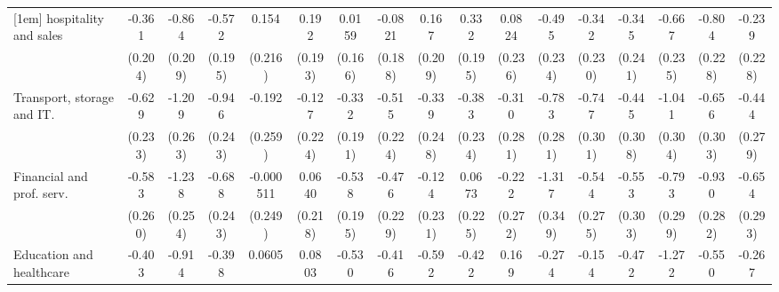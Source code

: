 {\begin{tabular}{l*{16}{c}}
[1em]
hospitality and sales&      -0.361         &      -0.864\sym{***}&      -0.572\sym{**} &       0.154         &       0.192         &      0.0159         &     -0.0821         &       0.167         &       0.332         &      0.0824         &      -0.495\sym{*}  &      -0.342         &      -0.345         &      -0.667\sym{**} &      -0.804\sym{***}&      -0.239         \\
                    &     (0.204)         &     (0.209)         &     (0.195)         &     (0.216)         &     (0.193)         &     (0.166)         &     (0.188)         &     (0.209)         &     (0.195)         &     (0.236)         &     (0.234)         &     (0.230)         &     (0.241)         &     (0.235)         &     (0.228)         &     (0.228)         \\
[1em]
Transport, storage and IT.&      -0.629\sym{**} &      -1.209\sym{***}&      -0.946\sym{***}&      -0.192         &      -0.127         &      -0.332         &      -0.515\sym{*}  &      -0.339         &      -0.383         &      -0.310         &      -0.783\sym{**} &      -0.747\sym{*}  &      -0.445         &      -1.041\sym{***}&      -0.656\sym{*}  &      -0.444         \\
                    &     (0.233)         &     (0.263)         &     (0.243)         &     (0.259)         &     (0.224)         &     (0.191)         &     (0.224)         &     (0.248)         &     (0.234)         &     (0.281)         &     (0.281)         &     (0.301)         &     (0.308)         &     (0.304)         &     (0.303)         &     (0.279)         \\
[1em]
Financial and prof. serv.&      -0.583\sym{*}  &      -1.238\sym{***}&      -0.688\sym{**} &   -0.000511         &      0.0640         &      -0.538\sym{**} &      -0.476\sym{*}  &      -0.124         &      0.0673         &      -0.222         &      -1.317\sym{***}&      -0.544\sym{*}  &      -0.553         &      -0.793\sym{**} &      -0.930\sym{***}&      -0.654\sym{*}  \\
                    &     (0.260)         &     (0.254)         &     (0.243)         &     (0.249)         &     (0.218)         &     (0.195)         &     (0.229)         &     (0.231)         &     (0.225)         &     (0.272)         &     (0.349)         &     (0.275)         &     (0.303)         &     (0.299)         &     (0.282)         &     (0.293)         \\
[1em]
Education and healthcare&      -0.403         &      -0.914\sym{***}&      -0.398         &      0.0605         &      0.0803         &      -0.530\sym{**} &      -0.416         &      -0.592\sym{*}  &      -0.422         &       0.169         &      -0.274         &      -0.154         &      -0.472         &      -1.272\sym{***}&      -0.550\sym{*}  &      -0.267         \\

\end{tabular}}
